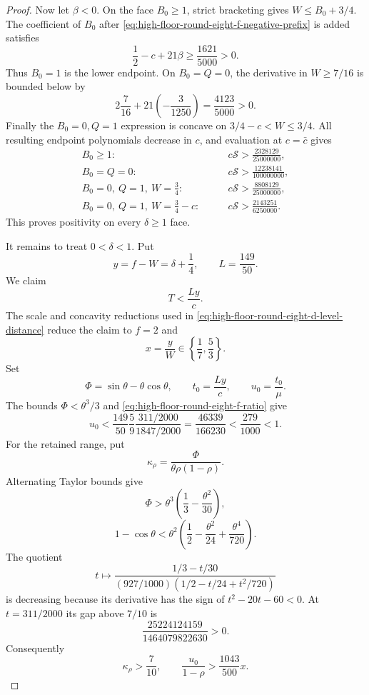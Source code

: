 \documentclass[11pt]{article}
\theoremstyle{remark}
\begin{document}
\begin{proof}
Now let $\beta<0$.  On the face $B_0\geq1$, strict bracketing gives
$W\leq B_0+3/4$.  The coefficient of $B_0$ after
\eqref{eq:high-floor-round-eight-f-negative-prefix} is added satisfies
\[
 \frac12-c+21\beta\geq\frac{1621}{5000}>0.
\]
Thus $B_0=1$ is the lower endpoint.  On $B_0=Q=0$, the derivative in
$W\geq7/16$ is bounded below by
\[
 2\frac7{16}+21\left(-\frac3{1250}\right)
 =\frac{4123}{5000}>0.
\]
Finally the $B_0=0,Q=1$ expression is concave on
$3/4-c<W\leq3/4$.  All resulting endpoint polynomials decrease in $c$,
and evaluation at $c=\bar c$ gives
\begin{equation}
 \begin{aligned}
 B_0\geq1:&\qquad
 c\mathcal S>\frac{2328129}{25000000},\\
 B_0=Q=0:&\qquad
 c\mathcal S>\frac{12238141}{100000000},\\
 B_0=0,\ Q=1,\ W=\frac34:&\qquad
 c\mathcal S>\frac{8808129}{25000000},\\
 B_0=0,\ Q=1,\ W=\frac34-c:&\qquad
 c\mathcal S>\frac{2143251}{6250000}.
 \end{aligned}
 \label{eq:high-floor-round-eight-f-negative-ledgers}
\end{equation}
This proves positivity on every $\delta\geq1$ face.

It remains to treat $0<\delta<1$.  Put
\[
 y=f-W=\delta+\frac14,
 \qquad L=\frac{149}{50}.
\]
We claim
\begin{equation}
 \boxed{T<\frac{Ly}{c}.}
 \label{eq:high-floor-round-eight-f-level-distance}
\end{equation}
The scale and concavity reductions used in
\eqref{eq:high-floor-round-eight-d-level-distance} reduce the claim to
$f=2$ and
\[
 x=\frac yW\in\left\{\frac17,\frac53\right\}.
\]
Set
\[
 \Phi=\sin\theta-\theta\cos\theta,\qquad
 t_0=\frac{Ly}{c},\qquad u_0=\frac{t_0}{\mu}.
\]
The bounds $\Phi<\theta^3/3$ and
\eqref{eq:high-floor-round-eight-f-ratio} give
\begin{equation}
 u_0<\frac{149}{50}\frac59
       \frac{311/2000}{1847/2000}
 =\frac{46339}{166230}<\frac{279}{1000}<1.
 \label{eq:high-floor-round-eight-f-u-zero}
\end{equation}
For the retained range, put
\[
 \kappa_\rho=\frac{\Phi}{\theta\rho(1-\rho)}.
\]
Alternating Taylor bounds give
\[
 \Phi>\theta^3\left(\frac13-\frac{\theta^2}{30}\right),
\]
\[
 1-\cos\theta<\theta^2\left(
 \frac12-\frac{\theta^2}{24}+\frac{\theta^4}{720}\right).
\]
The quotient
\[
 t\longmapsto
 \frac{1/3-t/30}{(927/1000)(1/2-t/24+t^2/720)}
\]
is decreasing because its derivative has the sign of
$t^2-20t-60<0$.  At $t=311/2000$ its gap above $7/10$ is
\[
 \frac{25224124159}{1464079822630}>0.
\]
Consequently
\begin{equation}
 \kappa_\rho>\frac7{10},\qquad
 \frac{u_0}{1-\rho}>\frac{1043}{500}x.
 \label{eq:high-floor-round-eight-f-retained-range}
\end{equation}


\end{proof}
\end{document}
